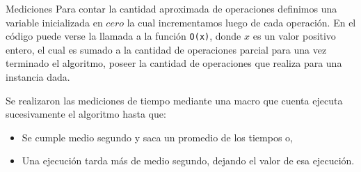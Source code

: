 \documentclass[12pt,titlepage]{article}
\begin{document}
	\begin{section}{Mediciones}
		Para contar la cantidad aproximada de operaciones definimos una variable inicializada en $cero$ la cual incrementamos luego de cada operación. En el código puede verse la llamada a la función \texttt{O(x)}, donde $x$ es un valor positivo entero, el cual es sumado a la cantidad de operaciones parcial para una vez terminado el algoritmo, poseer la cantidad de operaciones que realiza para una instancia dada.

		Se realizaron las mediciones de tiempo mediante una macro que cuenta ejecuta sucesivamente el algoritmo hasta que:
			\begin{itemize}
				\item Se cumple medio segundo y saca un promedio de los tiempos o,
				\item Una ejecución tarda más de medio segundo, dejando el valor de esa ejecución.
			\end{itemize}
	
	\end{section}
\end{document}
